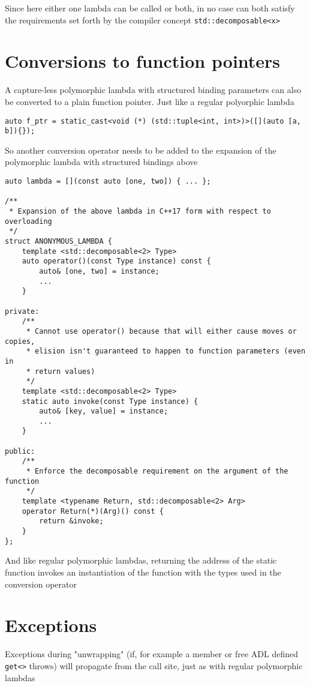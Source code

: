 \documentclass{article}
\begin{document}
Since here either one lambda can be called or both, in no case can both
satisfy the requirements set forth by the compiler concept
\texttt{std::decomposable<x>}


\section{Conversions to function pointers}
A capture-less polymorphic lambda with structured binding parameters can also
be converted to a plain function pointer.  Just like a regular polyorphic
lambda

\begin{lstlisting}
auto f_ptr = static_cast<void (*) (std::tuple<int, int>)>([](auto [a, b]){});
\end{lstlisting}

So another conversion operator needs to be added to the expansion of the
polymorphic lambda with structured bindings above

\begin{lstlisting}
auto lambda = [](const auto [one, two]) { ... };

/**
 * Expansion of the above lambda in C++17 form with respect to overloading
 */
struct ANONYMOUS_LAMBDA {
    template <std::decomposable<2> Type>
    auto operator()(const Type instance) const {
        auto& [one, two] = instance;
        ...
    }

private:
    /**
     * Cannot use operator() because that will either cause moves or copies,
     * elision isn't guaranteed to happen to function parameters (even in
     * return values)
     */
    template <std::decomposable<2> Type>
    static auto invoke(const Type instance) {
        auto& [key, value] = instance;
        ...
    }

public:
    /**
     * Enforce the decomposable requirement on the argument of the function
     */
    template <typename Return, std::decomposable<2> Arg>
    operator Return(*)(Arg)() const {
        return &invoke;
    }
};
\end{lstlisting}

And like regular polymorphic lambdas, returning the address of the static
function invokes an instantiation of the function with the types used in the
conversion operator

\section{Exceptions}
Exceptions during "unwrapping" (if, for example a member or free ADL defined
\texttt{get<>} throws) will propagate from the call site, just as with regular
polymorphic lambdas
\end{document}
